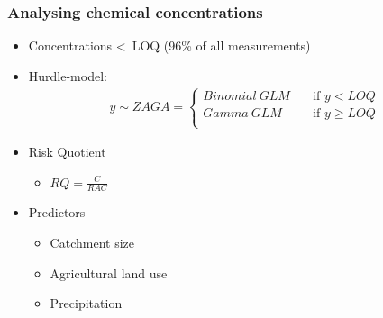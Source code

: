 \documentclass[
	12pt
	]{beamer}
\begin{document}
\begin{frame}
\frametitle{Analysing chemical concentrations}
	\begin{itemize}
		\pause
		\item Concentrations \textless~LOQ (96\% of all measurements)
		\pause
		\item Hurdle-model: 
			\begin{align*}
			y \sim ZAGA = 
			  \begin{cases}
			    Binomial~GLM   & \quad  \text{if } y < LOQ \\
			    Gamma~GLM & \quad \text{if } y \ge LOQ \\
			  \end{cases}
			\end{align*}
		\pause
		\item Risk Quotient
			\begin{itemize}
				\item \large $RQ = \frac{C}{RAC}$
			\end{itemize}
		\pause
		\item Predictors
		    \begin{itemize}
				\item Catchment size 
				\item Agricultural land use
				\item Precipitation
			\end{itemize}
	\end{itemize}
\end{frame}
\end{document}
